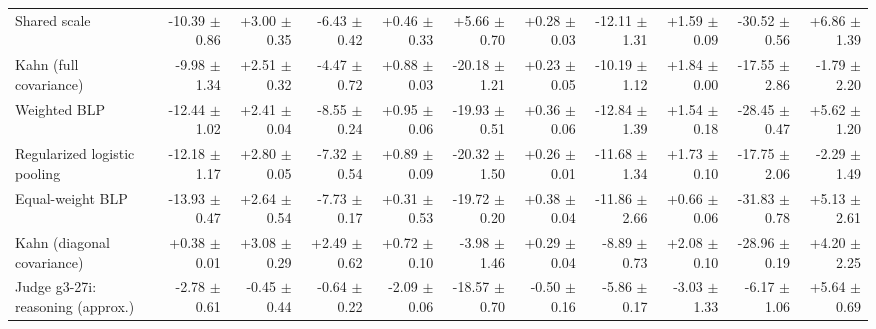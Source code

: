 \begin{tabular}{lrrrrrrrrrr}
Shared scale & -10.39 {\scriptsize $\pm$ 0.86} & +3.00 {\scriptsize $\pm$ 0.35} & -6.43 {\scriptsize $\pm$ 0.42} & +0.46 {\scriptsize $\pm$ 0.33} & +5.66 {\scriptsize $\pm$ 0.70} & +0.28 {\scriptsize $\pm$ 0.03} & -12.11 {\scriptsize $\pm$ 1.31} & +1.59 {\scriptsize $\pm$ 0.09} & -30.52 {\scriptsize $\pm$ 0.56} & +6.86 {\scriptsize $\pm$ 1.39} \\
Kahn (full covariance) & -9.98 {\scriptsize $\pm$ 1.34} & +2.51 {\scriptsize $\pm$ 0.32} & -4.47 {\scriptsize $\pm$ 0.72} & +0.88 {\scriptsize $\pm$ 0.03} & -20.18 {\scriptsize $\pm$ 1.21} & +0.23 {\scriptsize $\pm$ 0.05} & -10.19 {\scriptsize $\pm$ 1.12} & +1.84 {\scriptsize $\pm$ 0.00} & -17.55 {\scriptsize $\pm$ 2.86} & -1.79 {\scriptsize $\pm$ 2.20} \\
Weighted BLP & -12.44 {\scriptsize $\pm$ 1.02} & +2.41 {\scriptsize $\pm$ 0.04} & -8.55 {\scriptsize $\pm$ 0.24} & +0.95 {\scriptsize $\pm$ 0.06} & -19.93 {\scriptsize $\pm$ 0.51} & +0.36 {\scriptsize $\pm$ 0.06} & -12.84 {\scriptsize $\pm$ 1.39} & +1.54 {\scriptsize $\pm$ 0.18} & -28.45 {\scriptsize $\pm$ 0.47} & +5.62 {\scriptsize $\pm$ 1.20} \\
Regularized logistic pooling & -12.18 {\scriptsize $\pm$ 1.17} & +2.80 {\scriptsize $\pm$ 0.05} & -7.32 {\scriptsize $\pm$ 0.54} & +0.89 {\scriptsize $\pm$ 0.09} & -20.32 {\scriptsize $\pm$ 1.50} & +0.26 {\scriptsize $\pm$ 0.01} & -11.68 {\scriptsize $\pm$ 1.34} & +1.73 {\scriptsize $\pm$ 0.10} & -17.75 {\scriptsize $\pm$ 2.06} & -2.29 {\scriptsize $\pm$ 1.49} \\
Equal-weight BLP & -13.93 {\scriptsize $\pm$ 0.47} & +2.64 {\scriptsize $\pm$ 0.54} & -7.73 {\scriptsize $\pm$ 0.17} & +0.31 {\scriptsize $\pm$ 0.53} & -19.72 {\scriptsize $\pm$ 0.20} & +0.38 {\scriptsize $\pm$ 0.04} & -11.86 {\scriptsize $\pm$ 2.66} & +0.66 {\scriptsize $\pm$ 0.06} & -31.83 {\scriptsize $\pm$ 0.78} & +5.13 {\scriptsize $\pm$ 2.61} \\
Kahn (diagonal covariance) & +0.38 {\scriptsize $\pm$ 0.01} & +3.08 {\scriptsize $\pm$ 0.29} & +2.49 {\scriptsize $\pm$ 0.62} & +0.72 {\scriptsize $\pm$ 0.10} & -3.98 {\scriptsize $\pm$ 1.46} & +0.29 {\scriptsize $\pm$ 0.04} & -8.89 {\scriptsize $\pm$ 0.73} & +2.08 {\scriptsize $\pm$ 0.10} & -28.96 {\scriptsize $\pm$ 0.19} & +4.20 {\scriptsize $\pm$ 2.25} \\
Judge g3-27i: reasoning (approx.) & -2.78 {\scriptsize $\pm$ 0.61} & -0.45 {\scriptsize $\pm$ 0.44} & -0.64 {\scriptsize $\pm$ 0.22} & -2.09 {\scriptsize $\pm$ 0.06} & -18.57 {\scriptsize $\pm$ 0.70} & -0.50 {\scriptsize $\pm$ 0.16} & -5.86 {\scriptsize $\pm$ 0.17} & -3.03 {\scriptsize $\pm$ 1.33} & -6.17 {\scriptsize $\pm$ 1.06} & +5.64 {\scriptsize $\pm$ 0.69} \\

\end{tabular}
